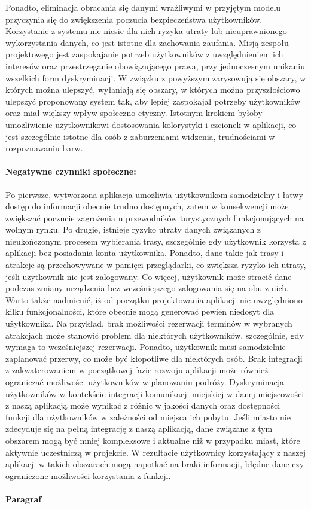 \indent Ponadto, eliminacja obracania się danymi wrażliwymi w przyjętym modelu przyczynia się do zwiększenia poczucia bezpieczeństwa użytkowników. Korzystanie z systemu nie niesie dla nich ryzyka utraty lub nieuprawnionego wykorzystania danych, co jest istotne dla zachowania zaufania. Misją zespołu projektowego jest zaspokajanie potrzeb użytkowników z uwzględnieniem ich interesów oraz przestrzeganie obowiązującego prawa, przy jednoczesnym unikaniu wszelkich form dyskryminacji.
W związku z powyższym zarysowują się obszary, w których można ulepszyć, wyłaniają się obszary, w których można przyszłościowo ulepszyć proponowany system tak, aby lepiej zaspokajał potrzeby użytkowników oraz miał większy wpływ społeczno-etyczny. Istotnym krokiem byłoby umożliwienie użytkownikowi dostosowania kolorystyki i czcionek w aplikacji, co jest szczególnie istotne dla osób z zaburzeniami widzenia, trudnościami w rozpoznawaniu barw.

\paragraph*{Negatywne czynniki społeczne:}
\indent Po pierwsze, wytworzona aplikacja umożliwia użytkownikom samodzielny i łatwy dostęp do informacji obecnie trudno dostępnych, zatem w konsekwencji może zwiększać poczucie zagrożenia u przewodników turystycznych funkcjonujących na wolnym rynku. 
\indent Po drugie, istnieje ryzyko utraty danych związanych z nieukończonym procesem wybierania trasy, szczególnie gdy użytkownik korzysta z aplikacji bez posiadania konta użytkownika. Ponadto, dane takie jak trasy i atrakcje są przechowywane w pamięci przeglądarki, co zwiększa ryzyko ich utraty, jeśli użytkownik nie jest zalogowany. Co więcej, użytkownik może stracić dane podczas zmiany urządzenia bez wcześniejszego zalogowania się na obu z nich.
\indent Warto także nadmienić, iż od początku projektowania aplikacji nie uwzględniono kilku funkcjonalności, które obecnie mogą generować pewien niedosyt dla użytkownika. Na przykład, brak możliwości rezerwacji terminów w wybranych atrakcjach może stanowić problem dla niektórych użytkowników, szczególnie, gdy wymaga to wcześniejszej rezerwacji. Ponadto, użytkownik musi samodzielnie zaplanować przerwy, co może być kłopotliwe dla niektórych osób. Brak integracji z zakwaterowaniem w początkowej fazie rozwoju aplikacji może również ograniczać możliwości użytkowników w planowaniu podróży.
\indent Dyskryminacja użytkowników w kontekście integracji komunikacji miejskiej w danej miejscowości z naszą aplikacją może wynikać z różnic w jakości danych oraz dostępności funkcji dla użytkowników w zależności od miejsca ich pobytu.
Jeśli miasto nie zdecyduje się na pełną integrację z naszą aplikacją, dane związane z tym obszarem mogą być mniej kompleksowe i aktualne niż w przypadku miast, które aktywnie uczestniczą w projekcie. W rezultacie użytkownicy korzystający z naszej aplikacji w takich obszarach mogą napotkać na braki informacji, błędne dane czy ograniczone możliwości korzystania z funkcji.

\paragraph{Paragraf}


